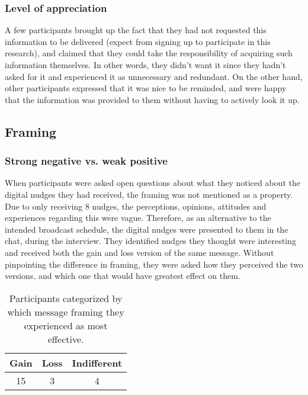 \subsubsection{Level of appreciation}
A few participants brought up the fact that they had not requested this information to be delivered (expect from signing up to participate in this research), and claimed that they could take the responsibility of acquiring such information themselves. In other words, they didn't want it since they hadn't asked for it and experienced it as unnecessary and redundant. On the other hand, other participants expressed that it was nice to be reminded, and were happy that the information was provided to them without having to actively look it up. 

\subsection{Framing}
\subsubsection{Strong negative vs. weak positive}
When participants were asked open questions about what they noticed about the digital nudges they had received, the framing was not mentioned as a property. Due to only receiving 8 nudges, the perceptions, opinions, attitudes and experiences regarding this were vague. Therefore, as an alternative to the intended broadcast schedule, the digital nudges were presented to them in the chat, during the interview. They identified nudges they thought were interesting and received both the gain and loss version of the same message. Without pinpointing the difference in framing, they were asked how they perceived the two versions, and which one that would have greatest effect on them.

\begin{table}[ht]
\begin{center}
\begin{tabular}{|c|c|c|}
\hline
\textbf{Gain} & \textbf{Loss} & \textbf{Indifferent} \\ \hline
15 & 3 & 4 \\ \hline
\end{tabular}
\caption{\label{tab:table-name} Participants categorized by which message framing they experienced as most effective.}
\end{center}
\end{table}

